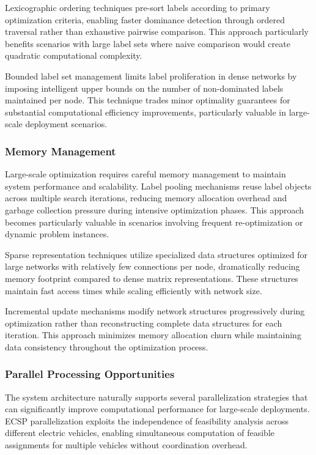 \documentclass[12pt,a4paper]{article}
\begin{document}
Lexicographic ordering techniques pre-sort labels according to primary optimization criteria, enabling faster dominance detection through ordered traversal rather than exhaustive pairwise comparison. This approach particularly benefits scenarios with large label sets where naive comparison would create quadratic computational complexity.

Bounded label set management limits label proliferation in dense networks by imposing intelligent upper bounds on the number of non-dominated labels maintained per node. This technique trades minor optimality guarantees for substantial computational efficiency improvements, particularly valuable in large-scale deployment scenarios.

\subsubsection{Memory Management}
Large-scale optimization requires careful memory management to maintain system performance and scalability. Label pooling mechanisms reuse label objects across multiple search iterations, reducing memory allocation overhead and garbage collection pressure during intensive optimization phases. This approach becomes particularly valuable in scenarios involving frequent re-optimization or dynamic problem instances.

Sparse representation techniques utilize specialized data structures optimized for large networks with relatively few connections per node, dramatically reducing memory footprint compared to dense matrix representations. These structures maintain fast access times while scaling efficiently with network size.

Incremental update mechanisms modify network structures progressively during optimization rather than reconstructing complete data structures for each iteration. This approach minimizes memory allocation churn while maintaining data consistency throughout the optimization process.

\subsubsection{Parallel Processing Opportunities}
The system architecture naturally supports several parallelization strategies that can significantly improve computational performance for large-scale deployments. ECSP parallelization exploits the independence of feasibility analysis across different electric vehicles, enabling simultaneous computation of feasible assignments for multiple vehicles without coordination overhead.
\end{document}
